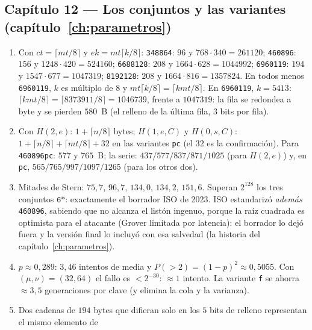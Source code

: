 \subsection*{Capítulo 12 --- Los conjuntos y las variantes
(capítulo~\ref{ch:parametros})}

\begin{enumerate}[leftmargin=1.9em,itemsep=4pt]
  \item Con $ct=\lceil mt/8\rceil$ y $ek=mt\lceil k/8\rceil$:
        \texttt{348864}: $96$ y $768\cdot340=\num{261120}$;
        \texttt{460896}: $156$ y $1248\cdot420=\num{524160}$;
        \texttt{6688128}: $208$ y $1664\cdot628=\num{1044992}$;
        \texttt{6960119}: $194$ y $1547\cdot677=\num{1047319}$;
        \texttt{8192128}: $208$ y $1664\cdot816=\num{1357824}$.
        En todos menos \texttt{6960119}, $k$ es múltiplo de $8$ y
        $mt\lceil k/8\rceil=\lceil kmt/8\rceil$. En
        \texttt{6960119}, $k=5413$: $\lceil kmt/8\rceil
        =\lceil\num{8373911}/8\rceil=\num{1046739}$, frente a
        $\num{1047319}$: la fila se redondea a byte y se pierden
        $580$~B (el relleno de la última fila, $3$ bits por fila).
  \item Con $H(2,e)$: $1+\lceil n/8\rceil$ bytes;
        $H(1,e,C)$ y $H(0,s,C)$: $1+\lceil n/8\rceil+\lceil mt/8\rceil
        +32$ en las variantes \texttt{pc} (el $32$ es la
        confirmación). Para \texttt{460896pc}: $577$ y $765$~B; la
        serie: $437/577/837/871/1025$ (para $H(2,e)$) y, en
        \texttt{pc}, $565/765/997/1097/1265$ (para los otros dos).
  \item Mitades de Stern: $75{,}7$, $96{,}7$, $134{,}0$,
        $134{,}2$, $151{,}6$. Superan $2^{128}$ los tres conjuntos
        $\texttt{6*}$: exactamente el borrador ISO de 2023. ISO
        estandarizó \emph{además} \texttt{460896}, sabiendo que no
        alcanza el listón ingenuo, porque la raíz cuadrada es
        optimista para el atacante (Grover limitada por latencia):
        el borrador lo dejó fuera y la versión final lo incluyó con
        esa salvedad (la historia del capítulo~\ref{ch:parametros}).
  \item $p\approx0{,}289$: $3{,}46$ intentos de media y
        $P(>2)=(1-p)^2\approx0{,}5055$. Con $(\mu,\nu)=(32,64)$ el
        fallo es $<2^{-30}$: $\approx1$ intento. La variante
        \texttt{f} se ahorra $\approx3{,}5$ generaciones por clave
        (y elimina la cola y la varianza).
  \item Dos cadenas de $194$ bytes que difieran solo en los $5$
        bits de relleno representan el mismo elemento de

\end{enumerate}
